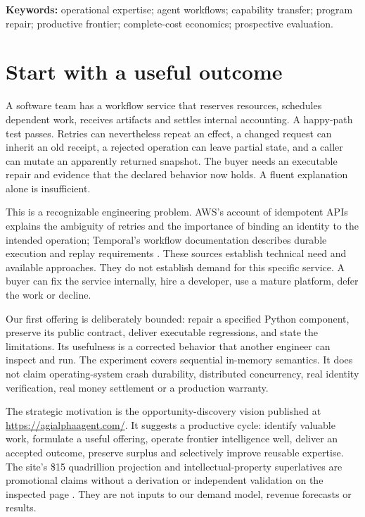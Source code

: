 \documentclass[11pt,letterpaper]{article}
\begin{document}
\textbf{Keywords:} operational expertise; agent workflows; capability transfer; program repair; productive frontier; complete-cost economics; prospective evaluation.

\section{Start with a useful outcome}
A software team has a workflow service that reserves resources, schedules dependent work, receives artifacts and settles internal accounting. A happy-path test passes. Retries can nevertheless repeat an effect, a changed request can inherit an old receipt, a rejected operation can leave partial state, and a caller can mutate an apparently returned snapshot. The buyer needs an executable repair and evidence that the declared behavior now holds. A fluent explanation alone is insufficient.

This is a recognizable engineering problem. AWS's account of idempotent APIs explains the ambiguity of retries and the importance of binding an identity to the intended operation; Temporal's workflow documentation describes durable execution and replay requirements \cite{aws,temporal}. These sources establish technical need and available approaches. They do not establish demand for this specific service. A buyer can fix the service internally, hire a developer, use a mature platform, defer the work or decline.

Our first offering is deliberately bounded: repair a specified Python component, preserve its public contract, deliver executable regressions, and state the limitations. Its usefulness is a corrected behavior that another engineer can inspect and run. The experiment covers sequential in-memory semantics. It does not claim operating-system crash durability, distributed concurrency, real identity verification, real money settlement or a production warranty.

The strategic motivation is the opportunity-discovery vision published at \url{https://agialphaagent.com/}. It suggests a productive cycle: identify valuable work, formulate a useful offering, operate frontier intelligence well, deliver an accepted outcome, preserve surplus and selectively improve reusable expertise. The site's \$15 quadrillion projection and intellectual-property superlatives are promotional claims without a derivation or independent validation on the inspected page \cite{vision}. They are not inputs to our demand model, revenue forecasts or results.
\end{document}
